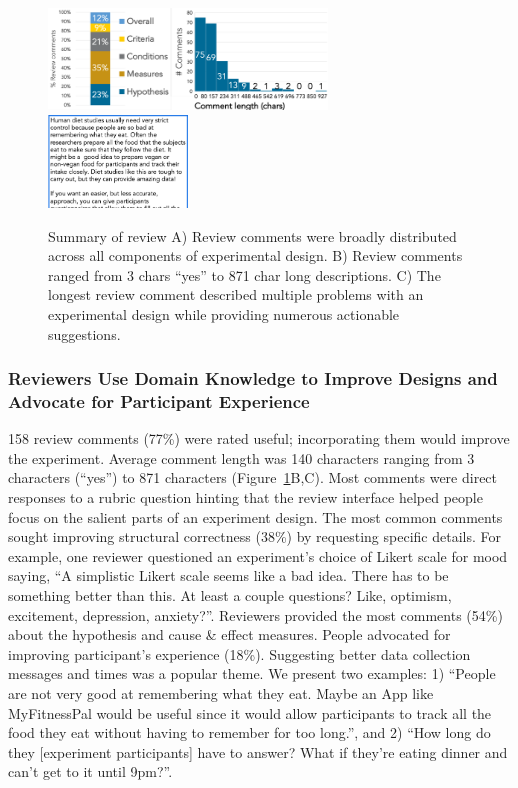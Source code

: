 \begin{figure}[h] 
  \includegraphics[width=0.66\textwidth]{figures/galileo/galileo-study2-2}
  \includegraphics[width=0.33\textwidth]{figures/galileo/galileo-study2-3}
  \caption[Result: Review comments were distributed across all components of experimental design]
{Summary of review A) Review comments were broadly distributed across all components of experimental design. B) Review comments ranged from 3 chars “yes” to 871 char long descriptions. C) The longest review comment described multiple problems with an experimental design while providing numerous actionable suggestions. }
  \label{fig:galileo-result2-2}
\end{figure}

\subsubsection{Reviewers Use Domain Knowledge to Improve Designs and Advocate for Participant Experience}
158 review comments (77\%) were rated useful; incorporating them would improve the experiment. Average comment length was 140 characters ranging from 3 characters (“yes”) to 871 characters (Figure~\ref{fig:galileo-result2-2}B,C). Most comments were direct responses to a rubric question hinting that the review interface helped people focus on the salient parts of an experiment design.
The most common comments sought improving structural correctness (38\%) by requesting specific details. For example, one reviewer questioned an experiment's choice of Likert scale for mood saying, “A simplistic Likert scale seems like a bad idea. There has to be something better than this. At least a couple questions? Like, optimism, excitement, depression, anxiety?”. Reviewers provided the most comments (54\%) about the hypothesis and cause \& effect measures. People advocated for improving participant's experience (18\%). Suggesting better data collection messages and times was a popular theme. We present two examples: 1) “People are not very good at remembering what they eat. Maybe an App like MyFitnessPal would be useful since it would allow participants to track all the food they eat without having to remember for too long.”, and 2) “How long do they [experiment participants] have to answer? What if they're eating dinner and can't get to it until 9pm?”.

